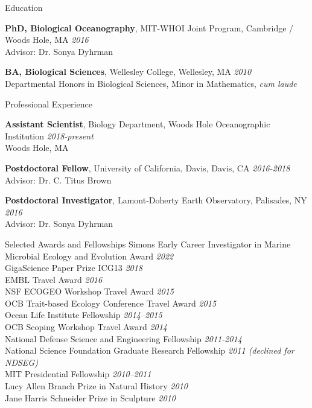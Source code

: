 \documentclass{resume}
\begin{document}

  \begin{rSection}{Education}
  
    {\textbf{PhD, Biological Oceanography}, MIT-WHOI Joint Program, Cambridge / Woods Hole, MA} \hfill {\em 2016} \\ 
    { Advisor: Dr. Sonya Dyhrman }  
    
    \smallskip
    
    {\textbf{BA, Biological Sciences}, Wellesley College, Wellesley, MA} \hfill {\em 2010} \\ 
     {Departmental Honors in Biological Sciences, Minor in Mathematics, {\textit{cum laude}}}
    
    
  \end{rSection}

  \begin{rSection}{Professional Experience}
  
    {\textbf{Assistant Scientist}, Biology Department, Woods Hole Oceanographic Institution} \hfill {\em 2018-present}\\
    {Woods Hole, MA}
    
    \smallskip
    
    {\textbf{Postdoctoral Fellow}, University of California, Davis, Davis, CA} \hfill {\em 2016-2018} \\
    {Advisor: Dr. C. Titus Brown}

    \smallskip
    
    {\textbf{Postdoctoral Investigator}, Lamont-Doherty Earth Observatory, Palisades, NY} \hfill {\em 2016} \\
    {Advisor: Dr. Sonya Dyhrman}
    
  \end{rSection}

\begin{rSection}{Selected Awards and Fellowships}
	{Simons Early Career Investigator in Marine Microbial Ecology and Evolution Award} \hfill{\em 2022} \\
	{GigaScience Paper Prize ICG13} \hfill {\em 2018}\\
	{EMBL Travel Award} \hfill {\em 2016}\\
	{NSF ECOGEO Workshop Travel Award} \hfill {\em 2015} \\
	{OCB Trait-based Ecology Conference Travel Award} \hfill {\em 2015}\\
	{Ocean Life Institute Fellowship} \hfill {\em 2014--2015} \\
	{OCB Scoping Workshop Travel Award} \hfill {\em 2014}\\
	{National Defense Science and Engineering Fellowship} \hfill {\em 2011-2014}\\
	{National Science Foundation Graduate Research Fellowship} \hfill \textit{2011 (declined for NDSEG)}\\
	{MIT Presidential Fellowship} \hfill {\em 2010--2011}\\
	{Lucy Allen Branch Prize in Natural History} \hfill {\em 2010}\\
	{Jane Harris Schneider Prize in Sculpture} \hfill {\em 2010}
\end{rSection}
\end{document}
